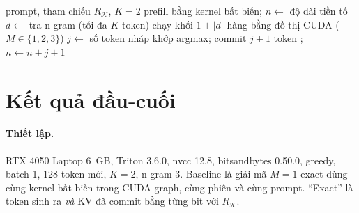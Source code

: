 \begin{algorithm}[t]
\caption{Vòng PLD exact với kernel bất biến.}\label{alg:loop}
\begin{algorithmic}[1]
\Require prompt, tham chiếu $R_{\mathcal K}$, $K{=}2$
\State prefill bằng kernel bất biến; $n \gets$ độ dài tiền tố
  \State $d \gets$ tra n-gram (tối đa $K$ token) 
  \State chạy khối $1{+}|d|$ hàng bằng đồ thị CUDA ($M\in\{1,2,3\}$)
  \State $j \gets$ số token nháp khớp argmax; commit $j{+}1$ token
  \State {}; $n \gets n+j+1$ 
\EndWhile
\end{algorithmic}
\end{algorithm}

\section{Kết quả đầu-cuối}\label{sec:k-results}
\paragraph{Thiết lập.} RTX 4050 Laptop 6~GB, Triton 3.6.0, nvcc 12.8, bitsandbytes 0.50.0, greedy, batch 1, $128$ token mới, $K{=}2$, n-gram $3$. Baseline là giải mã $M{=}1$ exact dùng cùng kernel bất biến trong CUDA graph, cùng phiên và cùng prompt. ``Exact'' là token sinh ra \emph{và} KV đã commit bằng từng bit với $R_{\mathcal K}$.

